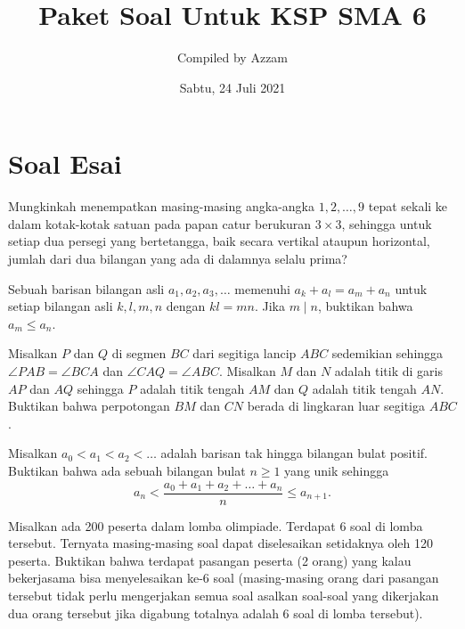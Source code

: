 \documentclass[12pt]{scrartcl}
\begin{document}
	\title{Paket Soal Untuk KSP SMA 6} %
	\date{Sabtu, 24 Juli 2021}
	\author{Compiled by Azzam}
	\maketitle

\renewcommand*\contentsname{Daftar Isi}
\tableofcontents

\newpage
	
	
	\section{Soal Esai}
	
	\begin{soalbaru} 
			Mungkinkah menempatkan masing-masing angka-angka $1,2,\dots,9$ tepat sekali ke dalam kotak-kotak satuan pada papan catur berukuran $3\times 3$, sehingga untuk setiap dua persegi yang bertetangga, baik secara vertikal ataupun horizontal, jumlah dari dua bilangan yang ada di dalamnya selalu prima?
		\end{soalbaru}
		
		
		\begin{soalbaru}
				Sebuah barisan bilangan asli $a_1,a_2,a_3,\dots$ memenuhi $a_k+a_l=a_m+a_n$ untuk setiap bilangan asli $k,l,m,n$ dengan $kl=mn$. Jika $m\mid n$, buktikan bahwa $a_m \le a_n$.
			\end{soalbaru}

	\begin{soalbaru}
		Misalkan $P$ dan $Q$ di segmen $BC$ dari segitiga lancip $ABC$ sedemikian sehingga $\angle PAB = \angle BCA$ dan $\angle CAQ = \angle ABC$. Misalkan $M$ dan $N$ adalah titik di garis $AP$ dan $AQ$ sehingga $P$ adalah titik tengah $AM$ dan $Q$ adalah titik tengah $AN$. Buktikan bahwa perpotongan $BM$ dan $CN$ berada di lingkaran luar segitiga $ABC$.
	\end{soalbaru}

	\begin{soalbaru}
		Misalkan $a_0 < a_1 < a_2 < \dots$ adalah barisan tak hingga bilangan bulat positif. Buktikan bahwa ada sebuah bilangan bulat $n \ge 1$ yang unik sehingga $$a_n < \dfrac{a_0+a_1+a_2+\dots+a_n}{n} \le a_{n+1}.$$
	\end{soalbaru}

	
	\begin{soalbaru}
	Misalkan ada 200 peserta dalam lomba olimpiade. Terdapat 6 soal di lomba tersebut. Ternyata masing-masing soal dapat diselesaikan setidaknya oleh 120 peserta.
	Buktikan bahwa terdapat pasangan peserta (2 orang) yang kalau bekerjasama bisa menyelesaikan ke-6 soal (masing-masing orang dari pasangan tersebut tidak perlu mengerjakan semua soal asalkan soal-soal yang dikerjakan dua orang tersebut jika digabung totalnya adalah 6 soal di lomba tersebut).
	\end{soalbaru}

	
\end{document}
